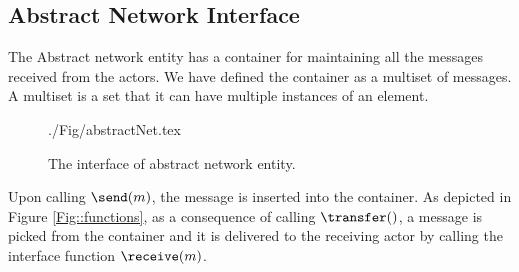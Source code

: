 \subsection{Abstract Network Interface}
The Abstract network entity has a container for maintaining all the messages received from the actors. We have defined the container as a multiset of messages. A multiset is a set that it can have multiple instances of an element.


	\begin{figure}[htbp]
		\centering
		{./Fig/abstractNet.tex}
		\caption{The interface of abstract network entity.}
		\label{fig::abstractNet}
	\end{figure}
	
Upon calling $\send(m)$, the message is inserted into the container. As depicted in Figure \ref{Fig::functions}, as a consequence of calling $\transfer()$,  a message is picked from the container and it is delivered to the receiving actor by calling the interface function $\receive(m)$.




